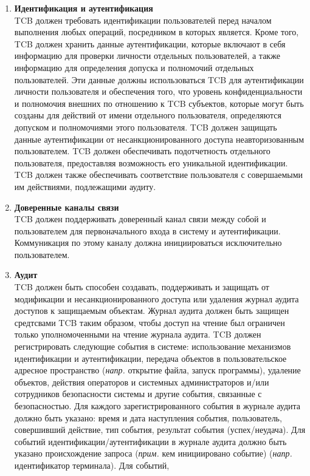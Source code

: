 \begin{enumerate}
\begin{enumerate}
\begin{enumerate}
\begin{enumerate}
				\item{\textbf{Идентификация и аутентификация}}\\
				TCB должен требовать идентификации пользователей перед началом выполнения любых операций, посредником в которых является. Кроме того, TCB должен хранить данные аутентификации, 
				которые включают в себя информацию для проверки личности отдельных пользователей, а также информацию для определения допуска и полномочий отдельных пользователей. Эти данные должны 
				использоваться TCB для аутентификации личности пользователя и обеспечения того, что уровень конфиденциальности и полномочия внешних по отношению к TCB субъектов, которые 
				могут быть созданы для действий от имени отдельного пользователя, определяются допуском и полномочиями этого пользователя. TCB должен защищать данные аутентификации от 
				несанкционированного доступа неавторизованным пользователем. TCB должен обеспечивать подотчетность отдельного пользователя, предоставляя возможность его уникальной идентификации.
				TCB должен также обеспечивать соответствие пользователя с совершаемыми им действиями, подлежащими аудиту.
				\item{\textbf{Доверенные каналы	связи}}\\
				TCB должен поддерживать доверенный канал связи между собой и пользователем для первоначального входа в систему и аутентификации. Коммуникация по этому каналу должна
				инициироваться исключительно пользователем.
				\item{\textbf{Аудит}}\\
				TCB должен быть способен создавать, поддерживать и защищать от модификации и несанкционированного доступа или удаления журнал аудита доступов к защищаемым объектам. Журнал аудита 
				должен быть защищен средтсвами TCB таким образом, чтобы доступ на чтение был ограничен только уполномоченными на чтение журнала аудита. TCB должен регистрировать следующие события
				в системе: использование механизмов идентификации и аутентификации, передача объектов в пользовательское адресное пространство (\textit{напр.} открытие файла, запуск программы),
				удаление объектов, действия операторов и системных администраторов и/или сотрудников безопасности системы и другие события, связанные с безопасностью. Для каждого зарегистрированного
				события в журнале аудита должно быть указано: время и дата наступления события, пользователь, совершивший действие, тип события, результат события (успех/неудача). Для событий
				идентификации/аутентификации в журнале аудита должно быть указано происхождение запроса (\textit{прим. } кем инициировано событие) (\textit{напр.} идентификатор терминала). Для событий,

\end{enumerate}
\end{enumerate}
\end{enumerate}
\end{enumerate}
